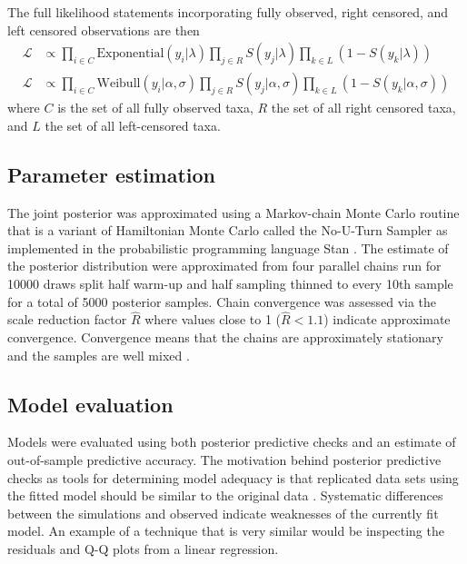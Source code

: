 \documentclass[12pt,letterpaper]{article}
\begin{document}
The full likelihood statements incorporating fully observed, right censored, and left censored observations are then
\begin{equation}
  \begin{aligned}
    \mathcal{L} &\propto \prod_{i \in C} \mathrm{Exponential}(y_{i} | \lambda) \prod_{j \in R} S(y_{j} | \lambda) \prod_{k \in L} \left(1 - S(y_{k} | \lambda)\right) \\
    \mathcal{L} &\propto \prod_{i \in C} \mathrm{Weibull}(y_{i} | \alpha, \sigma) \prod_{j \in R} S(y_{j} | \alpha, \sigma) \prod_{k \in L} \left(1 - S(y_{k} | \alpha, \sigma)\right)
  \end{aligned}
  \label{eq:censored_likelihood}
\end{equation}
where \(C\) is the set of all fully observed taxa, \(R\) the set of all right censored taxa, and \(L\) the set of all left-censored taxa.


\subsection{Parameter estimation}
The  joint posterior was approximated using a Markov-chain Monte Carlo routine that is a variant of Hamiltonian Monte Carlo called the No-U-Turn Sampler \citep{Hoffman2014} as implemented in the probabilistic programming language Stan \citep{2014stan}. The estimate of the posterior distribution were approximated from four parallel chains run for 10000 draws split half warm-up and half sampling thinned to every 10th sample for a total of 5000 posterior samples. Chain convergence was assessed via the scale reduction factor \(\hat{R}\) where values close to 1 (\(\hat{R} < 1.1\)) indicate approximate convergence. Convergence means that the chains are approximately stationary and the samples are well mixed \citep{Gelman2013d}.


\subsection{Model evaluation}

Models were evaluated using both posterior predictive checks and an estimate of out-of-sample predictive accuracy. The motivation behind posterior predictive checks as tools for determining model adequacy is that replicated data sets using the fitted model should be similar to the original data \citep{Gelman2013d}. Systematic differences between the simulations and observed indicate weaknesses of the currently fit model. An example of a technique that is very similar would be inspecting the residuals and Q-Q plots from a linear regression.
\end{document}
